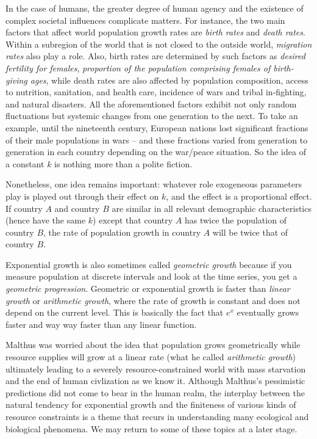 \documentclass{amsart}
\begin{document}
In the case of humans, the greater degree of human agency and the
existence of complex societal influences complicate matters. For
instance, the two main factors that affect world population growth
rates are {\em birth rates} and {\em death rates}. Within a subregion
of the world that is not closed to the outside world, {\em migration
rates} also play a role. Also, birth rates are determined by such
factors as {\em desired fertility for females}, {\em proportion of the
population comprising females of birth-giving ages}, while death rates
are also affected by population composition, access to nutrition,
sanitation, and health care, incidence of wars and tribal in-fighting,
and natural disasters. All the aforementioned factors exhibit not only
random fluctuations but systemic changes from one generation to the
next. To take an example, until the nineteenth century, European
nations lost significant fractions of their male populations in wars
-- and these fractions varied from generation to generation in each
country depending on the war/peace situation. So the idea of a
constant $k$ is nothing more than a polite fiction.

Nonetheless, one idea remains important: whatever role exogeneous
parameters play is played out through their effect on $k$, and the
effect is a proportional effect. If country $A$ and country $B$ are
similar in all relevant demographic characteristics (hence have the
same $k$) except that country $A$ has twice the population of country
$B$, the rate of population growth in country $A$ will be twice that
of country $B$.

Exponential growth is also sometimes called {\em geometric growth}
because if you measure population at discrete intervals and look at
the time series, you get a {\em geometric progression}. Geometric or
exponential growth is faster than {\em linear growth} or {\em
arithmetic growth}, where the rate of growth is constant and does not
depend on the current level. This is basically the fact that $e^x$
eventually grows faster and way way faster than any linear function.

Malthus was worried about the idea that population grows geometrically
while resource supplies will grow at a linear rate (what he called
{\em arithmetic growth}) ultimately leading to a severely
resource-constrained world with mass starvation and the end of human
civlization as we know it. Although Malthus's pessimistic predictions
did not come to bear in the human realm, the interplay between the
natural tendency for exponential growth and the finiteness of various
kinds of resource constraints is a theme that recurs in understanding
many ecological and biological phenomena. We may return to some of
these topics at a later stage.
\end{document}
